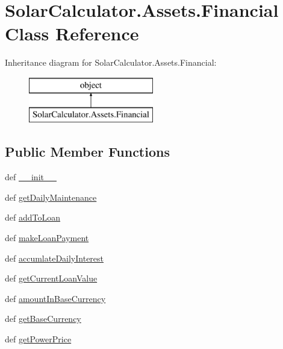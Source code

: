 \hypertarget{class_solar_calculator_1_1_assets_1_1_financial}{\section{Solar\-Calculator.\-Assets.\-Financial Class Reference}
\label{class_solar_calculator_1_1_assets_1_1_financial}
}
Inheritance diagram for Solar\-Calculator.\-Assets.\-Financial\-:\begin{figure}[H]
\begin{center}
\leavevmode
\includegraphics[height=2.000000cm]{class_solar_calculator_1_1_assets_1_1_financial}
\end{center}
\end{figure}
\subsection*{Public Member Functions}
\begin{DoxyCompactItemize}
\item 
def \hyperlink{class_solar_calculator_1_1_assets_1_1_financial_a8508bd0f6ec3ca7a595b5246766a6030}{\-\_\-\-\_\-init\-\_\-\-\_\-}
\item 
def \hyperlink{class_solar_calculator_1_1_assets_1_1_financial_ad54ace7b65ab37d36044b14314eab8d2}{get\-Daily\-Maintenance}
\item 
def \hyperlink{class_solar_calculator_1_1_assets_1_1_financial_a952645b18141bf5559eb93f827b6841d}{add\-To\-Loan}
\item 
def \hyperlink{class_solar_calculator_1_1_assets_1_1_financial_a3fc228750242e2d22d79178003b5f03b}{make\-Loan\-Payment}
\item 
def \hyperlink{class_solar_calculator_1_1_assets_1_1_financial_ad053c66a8db3456d06c5361c11cbf093}{accumlate\-Daily\-Interest}
\item 
def \hyperlink{class_solar_calculator_1_1_assets_1_1_financial_aacbf322ce435cb9ff149cf239922f87c}{get\-Current\-Loan\-Value}
\item 
def \hyperlink{class_solar_calculator_1_1_assets_1_1_financial_a3a7d157b2b91477659686e1678c0d362}{amount\-In\-Base\-Currency}
\item 
def \hyperlink{class_solar_calculator_1_1_assets_1_1_financial_aad6e9cc4ff2331ae7c44a1681913d7dd}{get\-Base\-Currency}
\item 
def \hyperlink{class_solar_calculator_1_1_assets_1_1_financial_afb9f71fcb7fbca303c057317a7d9e1e3}{get\-Power\-Price}
\end{DoxyCompactItemize}
